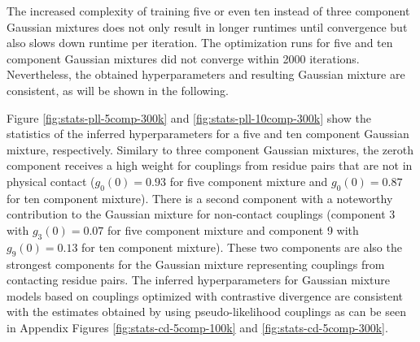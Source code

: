 \documentclass[11pt,a4paper,twoside]{book}
\newcommand{\eq}{\!=\!}
\theoremstyle{definition}
\theoremstyle{definition}
\theoremstyle{remark}
\begin{document}
The increased complexity of training five or even ten instead of three
component Gaussian mixtures does not only result in longer runtimes
until convergence but also slows down runtime per iteration. The
optimization runs for five and ten component Gaussian mixtures did not
converge within 2000 iterations. Nevertheless, the obtained
hyperparameters and resulting Gaussian mixture are consistent, as will
be shown in the following.

Figure \ref{fig:stats-pll-5comp-300k} and
\ref{fig:stats-pll-10comp-300k} show the statistics of the inferred
hyperparameters for a five and ten component Gaussian mixture,
respectively. Similary to three component Gaussian mixtures, the zeroth
component receives a high weight for couplings from residue pairs that
are not in physical contact (\(g_0(0) \eq 0.93\) for five component
mixture and \(g_0(0) \eq 0.87\) for ten component mixture). There is a
second component with a noteworthy contribution to the Gaussian mixture
for non-contact couplings (component 3 with \(g_3(0) \eq 0.07\) for five
component mixture and component 9 with \(g_9(0) \eq 0.13\) for ten
component mixture). These two components are also the strongest
components for the Gaussian mixture representing couplings from
contacting residue pairs. The inferred hyperparameters for Gaussian
mixture models based on couplings optimized with contrastive divergence
are consistent with the estimates obtained by using pseudo-likelihood
couplings as can be seen in Appendix Figures
\ref{fig:stats-cd-5comp-100k} and \ref{fig:stats-cd-5comp-300k}.
\end{document}
